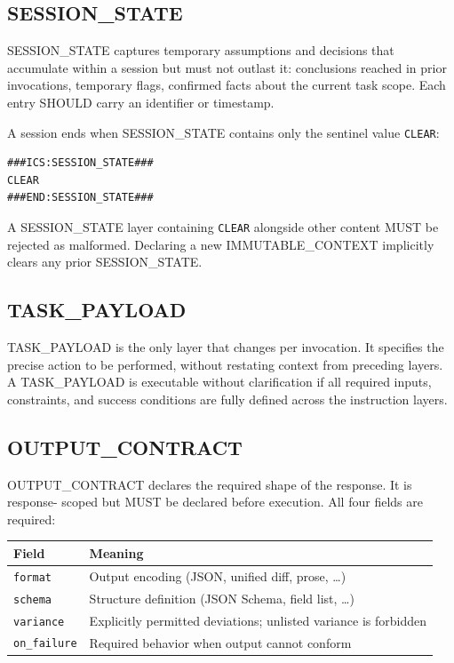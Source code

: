 \documentclass[11pt]{article}
\begin{document}
\subsection{SESSION\_STATE}
\label{sec:ss}

SESSION\_STATE captures temporary assumptions and decisions that accumulate
within a session but must not outlast it: conclusions reached in prior
invocations, temporary flags, confirmed facts about the current task scope.
Each entry SHOULD carry an identifier or timestamp.

A session ends when SESSION\_STATE contains only the sentinel value
\texttt{CLEAR}:

\begin{lstlisting}
###ICS:SESSION_STATE###
CLEAR
###END:SESSION_STATE###
\end{lstlisting}

A SESSION\_STATE layer containing \texttt{CLEAR} alongside other content MUST
be rejected as malformed. Declaring a new IMMUTABLE\_CONTEXT implicitly clears
any prior SESSION\_STATE.

\subsection{TASK\_PAYLOAD}
\label{sec:tp}

TASK\_PAYLOAD is the only layer that changes per invocation. It specifies the
precise action to be performed, without restating context from preceding
layers. A TASK\_PAYLOAD is executable without clarification if all required
inputs, constraints, and success conditions are fully defined across the
instruction layers.

\subsection{OUTPUT\_CONTRACT}
\label{sec:oc}

OUTPUT\_CONTRACT declares the required shape of the response. It is response-
scoped but MUST be declared before execution. All four fields are required:

\begin{center}
\begin{tabularx}{\linewidth}{lX}
\toprule
\textbf{Field} & \textbf{Meaning} \\
\midrule
\texttt{format}     & Output encoding (JSON, unified diff, prose, \ldots) \\
\texttt{schema}     & Structure definition (JSON Schema, field list, \ldots) \\
\texttt{variance}   & Explicitly permitted deviations; unlisted variance is forbidden \\
\texttt{on\_failure} & Required behavior when output cannot conform \\
\bottomrule
\end{tabularx}
\end{center}
\end{document}
